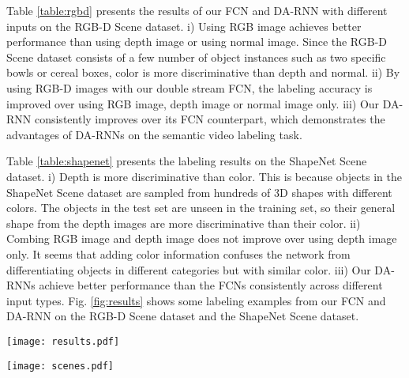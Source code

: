 \documentclass[conference]{IEEEtran}
\begin{document}
Table \ref{table:rgbd} presents the results of our FCN and DA-RNN with different inputs on the RGB-D Scene dataset. i) Using RGB image achieves better performance than using depth image or using normal image. Since the RGB-D Scene dataset consists of a few number of object instances such as two specific bowls or cereal boxes, color is more discriminative than depth and normal. ii) By using RGB-D images with our double stream FCN, the labeling accuracy is improved over using RGB image, depth image or normal image only. iii) Our DA-RNN consistently improves over its FCN counterpart, which demonstrates the advantages of DA-RNNs on the semantic video labeling task.

Table \ref{table:shapenet} presents the labeling results on the ShapeNet Scene dataset. i) Depth is more discriminative than color. This is because objects in the ShapeNet Scene dataset are sampled from hundreds of 3D shapes with different colors. The objects in the test set are unseen in the training set, so their general shape from the depth images are more discriminative than their color. ii) Combing RGB image and depth image does not improve over using depth image only. It seems that adding color information confuses the network from differentiating objects in different categories but with similar color. iii) Our DA-RNNs achieve better performance than the FCNs consistently across different input types. Fig. \ref{fig:results} shows some labeling examples from our FCN and DA-RNN on the RGB-D Scene dataset and the ShapeNet Scene dataset.

\begin{figure*}
	\centering
	\texttt{[image: results.pdf]}
	\caption{Semantic labeling examples on the RGBS Scene dataset and the ShapeNet Scene dataset.}
	\label{fig:results}
	\vspace{-2mm}
\end{figure*}

\begin{figure*}
	\centering
	\texttt{[image: scenes.pdf]}
	\caption{The semantic 3D mapping built by our method using the RGB-D Scene dataset.}
	\label{fig:scenes}
	\vspace{-6mm}
\end{figure*}
\end{document}
